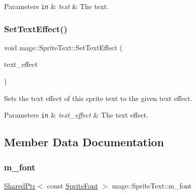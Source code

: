 \begin{DoxyParams}[1]{Parameters}
\mbox{\tt in}  & {\em text} & The text. \\
\hline
\end{DoxyParams}
\hypertarget{classmage_1_1_sprite_text_ae258a31796c3fa6b8c31e0b98010a0ef}{}\label{classmage_1_1_sprite_text_ae258a31796c3fa6b8c31e0b98010a0ef} 
\subsubsection{\texorpdfstring{Set\+Text\+Effect()}{SetTextEffect()}}
{\footnotesize\ttfamily void mage\+::\+Sprite\+Text\+::\+Set\+Text\+Effect (\begin{DoxyParamCaption}\item[{\hyperlink{classmage_1_1_sprite_text_ac60331e941d1f76551b7bdfad6ee7324}{Text\+Effect}}]{text\+\_\+effect }\end{DoxyParamCaption})\hspace{0.3cm}{\ttfamily [noexcept]}}

Sets the text effect of this sprite text to the given text effect.


\begin{DoxyParams}[1]{Parameters}
\mbox{\tt in}  & {\em text\+\_\+effect} & The text effect. \\
\hline
\end{DoxyParams}


\subsection{Member Data Documentation}
\hypertarget{classmage_1_1_sprite_text_a7d5f122cd5a87e47786796e41dbf6b71}{}\label{classmage_1_1_sprite_text_a7d5f122cd5a87e47786796e41dbf6b71} 
\subsubsection{\texorpdfstring{m\+\_\+font}{m\_font}}
{\footnotesize\ttfamily \hyperlink{namespacemage_a1e01ae66713838a7a67d30e44c67703e}{Shared\+Ptr}$<$ const \hyperlink{classmage_1_1_sprite_font}{Sprite\+Font} $>$ mage\+::\+Sprite\+Text\+::m\+\_\+font\hspace{0.3cm}{\ttfamily [private]}}

